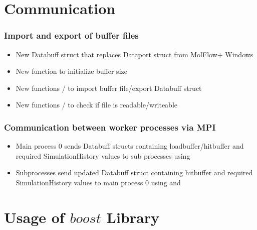 \section{Communication}
\subsubsection{Import and export of buffer files}
\begin{itemize}[noitemsep,topsep=0pt, partopsep=0pt]
\item New Databuff struct that replaces Dataport struct from MolFlow+ Windows
\end{itemize}
\begin{itemize}[noitemsep,topsep=0pt, partopsep=0pt]
\item New function  to initialize buffer size
\item New functions / to import buffer file/export Databuff struct
\item New functions / to check if file is readable/writeable
\end{itemize}

\subsubsection{Communication between worker processes via MPI}
\begin{itemize}[noitemsep,topsep=0pt, partopsep=0pt]
\item Main process 0 sends Databuff structs containing loadbuffer/hitbuffer and required SimulationHistory values to sub processes using 
\item Subprocesses send updated Databuff struct containing hitbuffer and required SimulationHistory values to main process 0 using  and 
\end{itemize}

\section{Usage of $boost$ Library}
